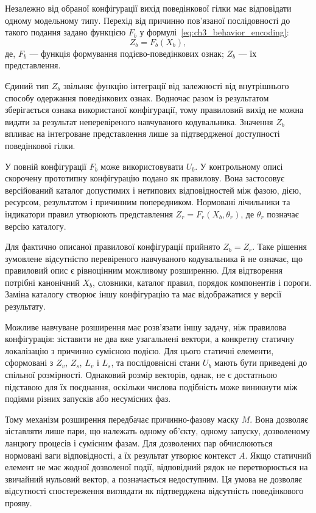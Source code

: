 Незалежно від обраної конфігурації вихід поведінкової гілки має відповідати одному модельному типу. Перехід від причинно пов’язаної послідовності до такого подання задано функцією $F_b$ у формулі~\eqref{eq:ch3_behavior_encoding}:
\begin{equation}
Z_b=F_b(X_b),
\label{eq:ch3_behavior_encoding}
\end{equation}
де, $F_b$ --- функція формування подієво-поведінкових ознак; $Z_b$ --- їх представлення.

Єдиний тип $Z_b$ звільняє функцію інтеграції від залежності від внутрішнього способу одержання поведінкових ознак. Водночас разом із результатом зберігається ознака використаної конфігурації, тому правиловий вихід не можна видати за результат неперевіреного навчуваного кодувальника. Значення $Z_b$ впливає на інтегроване представлення лише за підтвердженої доступності поведінкової гілки.

У повній конфігурації $F_b$ може використовувати $U_b$. У контрольному описі скорочену прототипну конфігурацію подано як правилову. Вона застосовує версійований каталог допустимих і нетипових відповідностей між фазою, дією, ресурсом, результатом і причинним попередником. Нормовані лічильники та індикатори правил утворюють представлення $Z_r=F_r(X_b,\theta_r)$, де $\theta_r$ позначає версію каталогу.

Для фактично описаної правилової конфігурації прийнято $Z_b=Z_r$. Таке рішення зумовлене відсутністю перевіреного навчуваного кодувальника й не означає, що правиловий опис є рівноцінним можливому розширенню. Для відтворення потрібні канонічний $X_b$, словники, каталог правил, порядок компонентів і пороги. Заміна каталогу створює іншу конфігурацію та має відображатися у версії результату.

Можливе навчуване розширення має розв’язати іншу задачу, ніж правилова конфігурація: зіставити не два вже узагальнені вектори, а конкретну статичну локалізацію з причинно сумісною подією. Для цього статичні елементи, сформовані з $Z_v$, $Z_s$, $L_v$ і $L_s$, та послідовнісні стани $U_b$ мають бути приведені до спільної розмірності. Однаковий розмір векторів, однак, не є достатньою підставою для їх поєднання, оскільки числова подібність може виникнути між подіями різних запусків або несумісних фаз.

Тому механізм розширення передбачає причинно-фазову маску $M$. Вона дозволяє зіставляти лише пари, що належать одному об’єкту, одному запуску, дозволеному ланцюгу процесів і сумісним фазам. Для дозволених пар обчислюються нормовані ваги відповідності, а їх результат утворює контекст $A$. Якщо статичний елемент не має жодної дозволеної події, відповідний рядок не перетворюється на звичайний нульовий вектор, а позначається недоступним. Ця умова не дозволяє відсутності спостереження виглядати як підтверджена відсутність поведінкового прояву.

